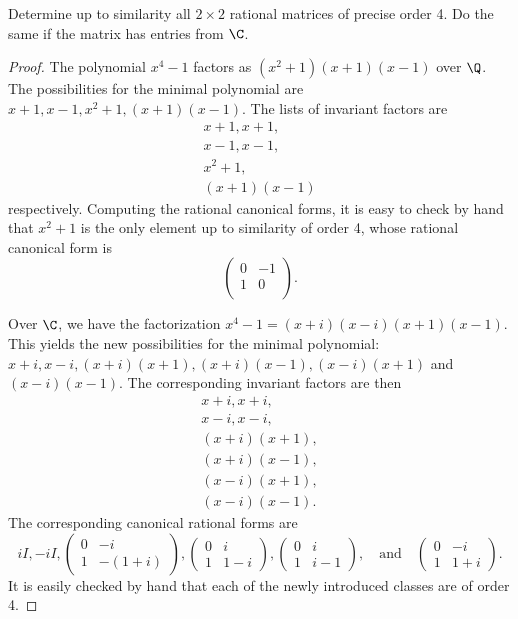 \documentclass[10pt]{amsart}
\begin{document}
\begin{thm}
  \label{Ex6}
  Determine up to similarity all $2 \times 2$ rational matrices of precise order 4.  
  Do the same if the matrix has entries from $\C$.
  \begin{proof}
    The polynomial $x^4 - 1$ factors as $(x^2 + 1)(x+1)(x-1)$ over $\Q$.
    The possibilities for the minimal polynomial are $x+1, x-1, x^2+1, (x+1)(x-1)$.
    The lists of invariant factors are 
    \begin{align*}
      x+1, x+1,\\
      x-1, x-1,\\
      x^2+1,\\
      (x+1)(x-1)
    \end{align*}
    respectively.
    Computing the rational canonical forms, it is easy to check by hand that $x^2+1$ is the only element up to similarity of order 4, whose rational canonical form is 
    $$
    \begin{pmatrix}
      0 & -1\\
      1 & 0\\
    \end{pmatrix}.
    $$
    
    Over $\C$, we have the factorization $x^4 - 1 = (x+i)(x-i)(x+1)(x-1)$.
    This yields the new possibilities for the minimal polynomial: $x+i, x-i, (x+i)(x+1), (x+i)(x-1), (x-i)(x+1)$ and $(x-i)(x-1)$.
    The corresponding invariant factors are then 
    \begin{align*}
      x+i, x+i,\\ 
      x-i, x-i,\\ 
      (x+i)(x+1),\\ 
      (x+i)(x-1),\\ 
      (x-i)(x+1),\\
      (x-i)(x-1).
    \end{align*}
    The corresponding canonical rational forms are 
    $$
    iI, -iI, 
    \begin{pmatrix}
      0 & -i\\
      1 & -(1+i)
    \end{pmatrix},
    \begin{pmatrix}
      0 & i\\
      1 & 1-i
    \end{pmatrix},
    \begin{pmatrix}
      0 & i\\
      1 & i-1
    \end{pmatrix},
    \quad \text{and} \quad
    \begin{pmatrix}
      0 & -i\\
      1 & 1+i
    \end{pmatrix}.
    $$
    It is easily checked by hand that each of the newly introduced classes are of order 4.
  \end{proof}
\end{thm}
\end{document}
